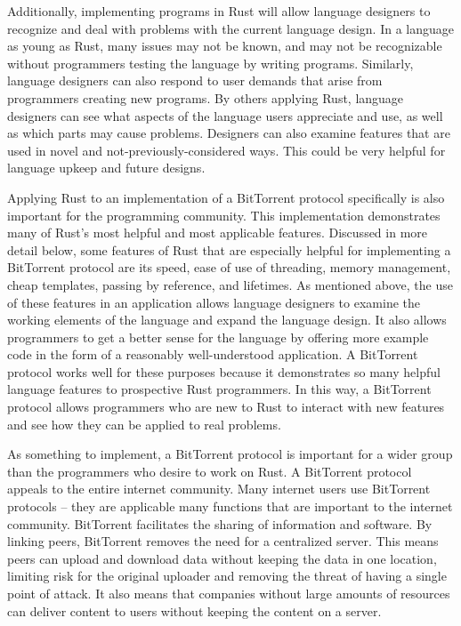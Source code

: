 \documentclass{acm_proc_article-sp}
\begin{document}
Additionally, implementing programs in Rust will allow language designers to recognize and deal with problems with the current language design.  In a language as young as Rust, many issues may not be known, and may not be recognizable without programmers testing the language by writing programs.  Similarly, language designers can also respond to user demands that arise from programmers creating new programs.  By others applying Rust, language designers can see what aspects of the language users appreciate and use, as well as which parts may cause problems.  Designers can also examine features that are used in novel and not-previously-considered ways.  This could be very helpful for language upkeep and future designs.

Applying Rust to an implementation of a BitTorrent protocol specifically is also important for the programming community.  This implementation demonstrates many of Rust's most helpful and most applicable features.  Discussed in more detail below, some features of Rust that are especially helpful for implementing a BitTorrent protocol are its speed, ease of use of threading, memory management, cheap templates, passing by reference, and lifetimes.  As mentioned above, the use of these features in an application allows language designers to examine the working elements of the language and expand the language design.  It also allows programmers to get a better sense for the language by offering more example code in the form of a reasonably well-understood application.  A BitTorrent protocol works well for these purposes because it demonstrates so many helpful language features to prospective Rust programmers.  In this way, a BitTorrent protocol allows programmers who are new to Rust to interact with new features and see how they can be applied to real problems.

As something to implement, a BitTorrent protocol is important for a wider group than the programmers who desire to work on Rust.  A BitTorrent protocol appeals to the entire internet community.  Many internet users use BitTorrent protocols -- they are applicable many functions that are important to the internet community.  BitTorrent facilitates the sharing of information and software.  By linking peers, BitTorrent removes the need for a centralized server.  This means peers can upload and download data without keeping the data in one location, limiting risk for the original uploader and removing the threat of having a single point of attack.  It also means that companies without large amounts of resources can deliver content to users without keeping the content on a server.
\end{document}
